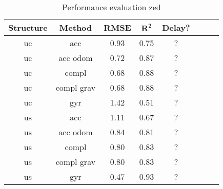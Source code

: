 \begin{table}[htbp]
	\centering
	\caption{Performance evaluation zed}
	\label{tab:eval_table}
	\begin{tabular}[t]{cccccccc}
		\toprule
		\textbf{Structure} & \textbf{Method} & \textbf{RMSE} & $\mathbf{R^2}$ & \textbf{Delay?} \\
		\midrule
		uc                 & acc             & 0.93          & 0.75           & ?               \\
		uc                 & acc odom        & 0.72          & 0.87           & ?               \\
		uc                 & compl           & 0.68          & 0.88           & ?               \\
		uc                 & compl grav      & 0.68          & 0.88           & ?               \\
		uc                 & gyr             & 1.42          & 0.51           & ?               \\
		us                 & acc             & 1.11          & 0.67           & ?               \\
		us                 & acc odom        & 0.84          & 0.81           & ?               \\
		us                 & compl           & 0.80          & 0.83           & ?               \\
		us                 & compl grav      & 0.80          & 0.83           & ?               \\
		us                 & gyr             & 0.47          & 0.93           & ?               \\
		\bottomrule
	\end{tabular}
\end{table}

